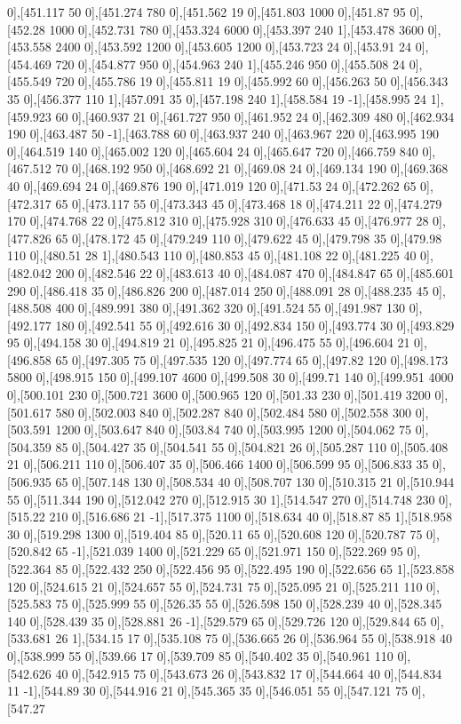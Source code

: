 {0],[451.117 50 0],[451.274 780 0],[451.562 19 0],[451.803 1000 0],[451.87 95 0],[452.28 1000 0],[452.731 780 0],[453.324 6000 0],[453.397 240 1],[453.478 3600 0],[453.558 2400 0],[453.592 1200 0],[453.605 1200 0],[453.723 24 0],[453.91 24 0],[454.469 720 0],[454.877 950 0],[454.963 240 1],[455.246 950 0],[455.508 24 0],[455.549 720 0],[455.786 19 0],[455.811 19 0],[455.992 60 0],[456.263 50 0],[456.343 35 0],[456.377 110 1],[457.091 35 0],[457.198 240 1],[458.584 19 -1],[458.995 24 1],[459.923 60 0],[460.937 21 0],[461.727 950 0],[461.952 24 0],[462.309 480 0],[462.934 190 0],[463.487 50 -1],[463.788 60 0],[463.937 240 0],[463.967 220 0],[463.995 190 0],[464.519 140 0],[465.002 120 0],[465.604 24 0],[465.647 720 0],[466.759 840 0],[467.512 70 0],[468.192 950 0],[468.692 21 0],[469.08 24 0],[469.134 190 0],[469.368 40 0],[469.694 24 0],[469.876 190 0],[471.019 120 0],[471.53 24 0],[472.262 65 0],[472.317 65 0],[473.117 55 0],[473.343 45 0],[473.468 18 0],[474.211 22 0],[474.279 170 0],[474.768 22 0],[475.812 310 0],[475.928 310 0],[476.633 45 0],[476.977 28 0],[477.826 65 0],[478.172 45 0],[479.249 110 0],[479.622 45 0],[479.798 35 0],[479.98 110 0],[480.51 28 1],[480.543 110 0],[480.853 45 0],[481.108 22 0],[481.225 40 0],[482.042 200 0],[482.546 22 0],[483.613 40 0],[484.087 470 0],[484.847 65 0],[485.601 290 0],[486.418 35 0],[486.826 200 0],[487.014 250 0],[488.091 28 0],[488.235 45 0],[488.508 400 0],[489.991 380 0],[491.362 320 0],[491.524 55 0],[491.987 130 0],[492.177 180 0],[492.541 55 0],[492.616 30 0],[492.834 150 0],[493.774 30 0],[493.829 95 0],[494.158 30 0],[494.819 21 0],[495.825 21 0],[496.475 55 0],[496.604 21 0],[496.858 65 0],[497.305 75 0],[497.535 120 0],[497.774 65 0],[497.82 120 0],[498.173 5800 0],[498.915 150 0],[499.107 4600 0],[499.508 30 0],[499.71 140 0],[499.951 4000 0],[500.101 230 0],[500.721 3600 0],[500.965 120 0],[501.33 230 0],[501.419 3200 0],[501.617 580 0],[502.003 840 0],[502.287 840 0],[502.484 580 0],[502.558 300 0],[503.591 1200 0],[503.647 840 0],[503.84 740 0],[503.995 1200 0],[504.062 75 0],[504.359 85 0],[504.427 35 0],[504.541 55 0],[504.821 26 0],[505.287 110 0],[505.408 21 0],[506.211 110 0],[506.407 35 0],[506.466 1400 0],[506.599 95 0],[506.833 35 0],[506.935 65 0],[507.148 130 0],[508.534 40 0],[508.707 130 0],[510.315 21 0],[510.944 55 0],[511.344 190 0],[512.042 270 0],[512.915 30 1],[514.547 270 0],[514.748 230 0],[515.22 210 0],[516.686 21 -1],[517.375 1100 0],[518.634 40 0],[518.87 85 1],[518.958 30 0],[519.298 1300 0],[519.404 85 0],[520.11 65 0],[520.608 120 0],[520.787 75 0],[520.842 65 -1],[521.039 1400 0],[521.229 65 0],[521.971 150 0],[522.269 95 0],[522.364 85 0],[522.432 250 0],[522.456 95 0],[522.495 190 0],[522.656 65 1],[523.858 120 0],[524.615 21 0],[524.657 55 0],[524.731 75 0],[525.095 21 0],[525.211 110 0],[525.583 75 0],[525.999 55 0],[526.35 55 0],[526.598 150 0],[528.239 40 0],[528.345 140 0],[528.439 35 0],[528.881 26 -1],[529.579 65 0],[529.726 120 0],[529.844 65 0],[533.681 26 1],[534.15 17 0],[535.108 75 0],[536.665 26 0],[536.964 55 0],[538.918 40 0],[538.999 55 0],[539.66 17 0],[539.709 85 0],[540.402 35 0],[540.961 110 0],[542.626 40 0],[542.915 75 0],[543.673 26 0],[543.832 17 0],[544.664 40 0],[544.834 11 -1],[544.89 30 0],[544.916 21 0],[545.365 35 0],[546.051 55 0],[547.121 75 0],[547.27 }
